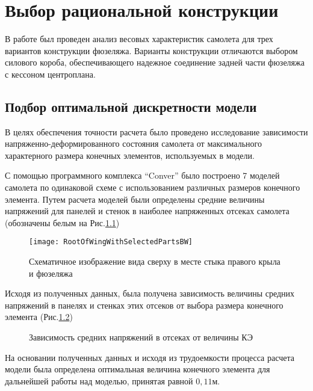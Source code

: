  
\chapter{Выбор рациональной конструкции}

В работе был проведен анализ весовых характеристик самолета для трех вариантов конструкции фюзеляжа. Варианты конструкции отличаются выбором силового короба, обеспечивающего надежное соединение задней части фюзеляжа с кессоном центроплана. 

%

\section{Подбор оптимальной дискретности модели}

В целях обеспечения точности расчета было проведено исследование зависимости напряженно-деформированного состояния самолета от максимального характерного размера конечных элементов, используемых в модели. 

С помощью программного комплекса ``Conver'' было построено 7 моделей самолета по одинаковой схеме с использованием различных размеров конечного элемента. Путем расчета моделей были определены средние величины напряжений для панелей и стенок в наиболее напряженных отсеках самолета (обозначены белым на  Рис.\ref{fig:WingRootPlain})

\begin{figure}[ht]
\centering
\texttt{[image: RootOfWingWithSelectedPartsBW]}
\caption{Схематичное изображение вида сверху в месте стыка правого крыла и фюзеляжа}
\label{fig:WingRootPlain}
\end{figure}




Исходя из полученных данных, была получена зависимость величины средних напряжений в панелях и стенках этих отсеков от выбора размера конечного элемента (Рис.\ref{fig:stressToDiscreteness})

\begin{figure}[H]
\centering

\caption{Зависимость средних напряжений в отсеках от величины КЭ}
\label{fig:stressToDiscreteness}
\end{figure}

На основании полученных данных и исходя из трудоемкости процесса расчета модели была определена оптимальная величина конечного элемента для дальнейшей работы над моделью, принятая равной $0,11\text{м}$. 

